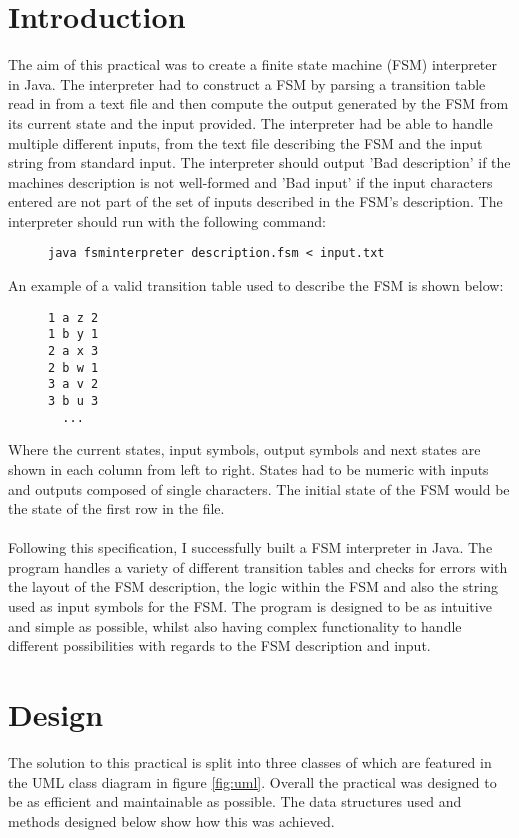 \documentclass{article}
\begin{document}
\section{Introduction}
The aim of this practical was to create a finite state machine (FSM) interpreter in Java. The interpreter had to construct a FSM by parsing a transition table read in from a text file and then compute the output generated by the FSM from its current state and the input provided. The interpreter had be able to handle multiple different inputs, from the text file describing the FSM and the input string from standard input. The interpreter should output 'Bad description' if the machines description is not well-formed and 'Bad input' if the input characters entered are not part of the set of inputs described in the FSM's description. The interpreter should run with the following command:
\begin{figure}[H]
\centering \begin{BVerbatim}
java fsminterpreter description.fsm < input.txt
\end{BVerbatim}
\end{figure}
\noindent An example of a valid transition table used to describe the FSM is shown below:
\begin{figure}[H]
\centering \begin{BVerbatim}
1 a z 2
1 b y 1
2 a x 3
2 b w 1
3 a v 2
3 b u 3
  ...
\end{BVerbatim}
\end{figure}
\noindent Where the current states, input symbols, output symbols and next states are shown in each column from left to right. States had to be numeric with inputs and outputs composed of single characters. The initial state of the FSM would be the state of the first row in the file. \\ \\ \noindent Following this specification, I successfully built a FSM interpreter in Java. The program handles a variety of different transition tables and checks for errors with the layout of the FSM description, the logic within the FSM and also the string used as input symbols for the FSM. The program is designed to be as intuitive and simple as possible, whilst also having complex functionality to handle different possibilities with regards to the FSM description and input.
\section{Design}
The solution to this practical is split into three classes of which are featured in the UML class diagram in figure \ref{fig:uml}. Overall the practical was designed to be as efficient and maintainable as possible. The data structures used and methods designed below show how this was achieved.
\end{document}
